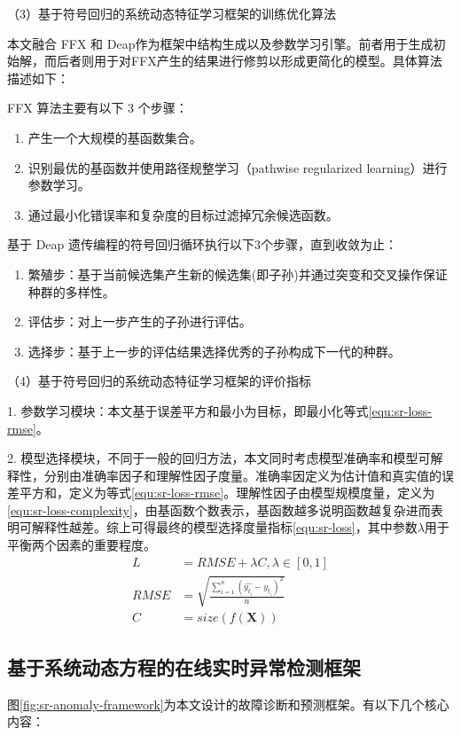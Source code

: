 （3）基于符号回归的系统动态特征学习框架的训练优化算法

本文融合 FFX\cite{mcconaghy2011ffx} 和 Deap\cite{fortin2012deap}作为框架中结构生成以及参数学习引擎。前者用于生成初始解，而后者则用于对FFX产生的结果进行修剪以形成更简化的模型。具体算法描述如下：

FFX 算法主要有以下 3 个步骤：
\begin{enumerate}[1.]
      \item 产生一个大规模的基函数集合。
      \item 识别最优的基函数并使用路径规整学习（pathwise regularized learning）进行参数学习。
      \item 通过最小化错误率和复杂度的目标过滤掉冗余候选函数。
\end{enumerate}
基于 Deap 遗传编程的符号回归循环执行以下3个步骤，直到收敛为止：
\begin{enumerate}[1.]
      \item 繁殖步：基于当前候选集产生新的候选集(即子孙)并通过突变和交叉操作保证种群的多样性。
      \item 评估步：对上一步产生的子孙进行评估。
      \item 选择步：基于上一步的评估结果选择优秀的子孙构成下一代的种群。
\end{enumerate}

（4）基于符号回归的系统动态特征学习框架的评价指标

1. 参数学习模块：本文基于误差平方和最小为目标，即最小化等式\ref{equ:sr-loss-rmse}。

2. 模型选择模块，不同于一般的回归方法，本文同时考虑模型准确率和模型可解释性，分别由准确率因子和理解性因子度量。准确率因定义为估计值和真实值的误差平方和，定义为等式\ref{equ:sr-loss-rmse}。理解性因子由模型规模度量，定义为\ref{equ:sr-loss-complexity}，由基函数个数表示，基函数越多说明函数越复杂进而表明可解释性越差。综上可得最终的模型选择度量指标\ref{equ:sr-loss}，其中参数$\lambda$用于平衡两个因素的重要程度。
\begin{subequations}
\begin{align}
L &= RMSE + \lambda C \label{equ:sr-loss} , \lambda \in [0,1]\\
RMSE &= \sqrt{\frac{\sum_{i=1}^{n} (\hat{y_{t_{i}}} - y_{t_{i}})^{2}}{n} } \label{equ:sr-loss-rmse} \\
C &= size(f(\mathbf{X})) \label{equ:sr-loss-complexity}
\end{align}
\end{subequations}

\subsection{基于系统动态方程的在线实时异常检测框架}
图\ref{fig:sr-anomaly-framework}为本文设计的故障诊断和预测框架。有以下几个核心内容：

